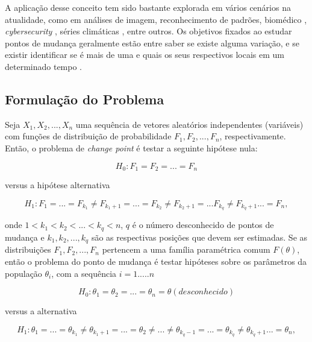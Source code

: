 A aplicação desse conceito tem sido bastante explorada em vários cenários na atualidade, como em análises de imagem, reconhecimento de padrões, biomédico \cite{Fan2015}, \textit{cybersecurity} \cite{Polunchenko2012}, séries climáticas \cite{Bates2012}, entre outros. Os objetivos fixados ao estudar pontos de mudança geralmente estão entre saber se existe alguma variação, e se existir identificar se é mais de uma e quais os seus respectivos locais em um determinado tempo \cite{Chen1-2000}.

\subsection{Formulação do Problema}

Seja $X_1, X_2, ..., X_n$ uma sequência de vetores aleatórios independentes (variáveis) com funções de distribuição de probabilidade $F_1, F_2, ..., F_n$, respectivamente. Então, o problema de \textit{change point} é testar a seguinte hipótese nula:

\begin{equation}
    H_0 : F_1 = F_2 = ... = F_n
    \label{eq:cpd-hupotese-nula-1}
\end{equation}

versus a hipótese alternativa

\begin{equation}
    H_{1} : F_{1} = ... = F_{k_1}\neq F_{{k_1}+1} = ... = F_{k_2}\neq F_{{k_2}+1} = ... F_{k_q}\neq F_{{k_q}+1} ... = F_{n},
    \label{eq:cpd-hipotese-alternativa-1}
\end{equation}

onde $1 < k_1 < k_2 < ... < k_q <n$, $q$ é o número desconhecido de pontos de mudança e $k_1, k_2, ..., k_q$ são as respectivas posições que devem ser estimadas. Se as distribuições $F_1, F_2, ..., F_n$ pertencem a uma família paramétrica comum $F(\theta)$, 
então o problema do ponto de mudança é testar hipóteses sobre os parâmetros da população $\theta_i$, com a sequência $i = 1 ..... n$

\begin{equation}
    H_0 : \theta_{1} = \theta_{2} = ... = \theta_{n} = \theta (desconhecido)
    \label{eq:cpd-hupotese-nula-2}
\end{equation}

versus a alternativa

\begin{equation}
    H_1 : \theta_{1} = ... = \theta_{k_1} \not = \theta_{{k_1}+1} = ... = \theta_{2} \not = ... \not = \theta_{{k_q}-1} = ... = \theta_{k_q} \not = \theta_{{k_q}+1}... = \theta_{n},
    \label{eq:cpd-hipotese-alternativa-2}
\end{equation}

